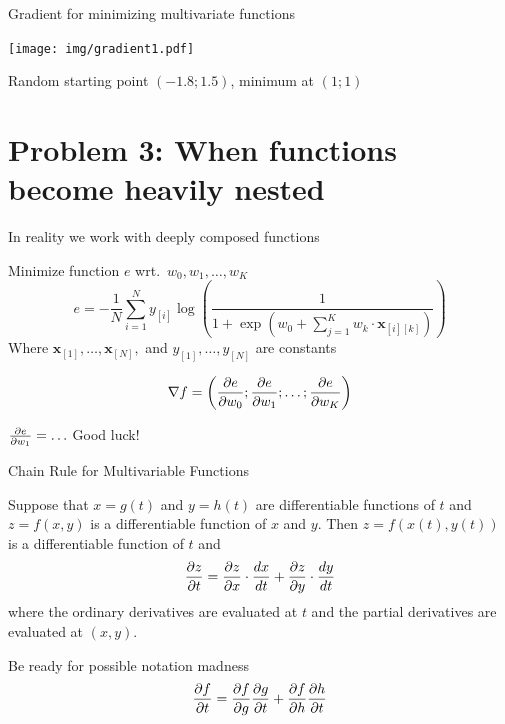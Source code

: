 \documentclass[12pt,aspectratio=169,handout]{beamer}
\begin{document}
\begin{frame}{Gradient for minimizing multivariate functions}
	
	\texttt{[image: img/gradient1.pdf]}
	
	
	Random starting point $(-1.8; 1.5)$, minimum at $(1; 1)$
	
\end{frame}

\section{Problem 3: When functions become heavily nested}


\begin{frame}{In reality we work with deeply composed functions}
	
	\begin{example}
		Minimize function $e$ wrt.\ $w_0, w_1, \ldots, w_K$
		$$
		e = - \frac{1}{N} \sum_{i = 1}^{N} y_{[i]} \log
		\left(
		\frac{1}{1 +
			\exp\left( w_0 + \sum_{j=1}^{K} w_k \cdot \bm{x}_{[i][k]} \right)
		}
		\right)
		$$
		Where $\bm{x}_{[1]}, \ldots, \bm{x}_{[N]},$ and $y_{[1]}, \ldots, y_{[N]}$ are constants
	\end{example}
	
	\pause
	
	$$
	\nabla f = \left( \pdv{e}{w_0}; \pdv{e}{w_1}; \ldots; \pdv{e}{w_K} \right)
	$$
	
	$\pdv{e}{w_1} = \ldots$ \pause Good luck!
	
\end{frame}


\begin{frame}{Chain Rule for Multivariable Functions}
	
	
	Suppose that $x=g(t)$ and $y=h(t)$ are differentiable functions of $t$ and $z=f(x,y)$ is a differentiable function of $x$ and $y$. Then $z=f(x(t),y(t))$ is a differentiable function of $t$ and
	$$
	\pdv{z}{t} =  \pdv{z}{x} \cdot \frac{dx}{dt} + \pdv{z}{y} \cdot \frac{dy}{dt}
	$$
	where the ordinary derivatives are evaluated at $t$ and the partial derivatives are evaluated at $(x,y)$.
	
	\pause
	
	\begin{block}{Be ready for possible notation madness}
		$$
		\pdv{f}{t} =  \pdv{f}{g} \pdv{g}{t} + \pdv{f}{h} \pdv{h}{t}
		$$
	\end{block}
	
\end{frame}
\end{document}
